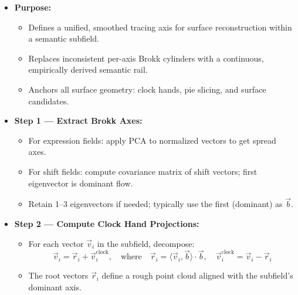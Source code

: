         \begin{itemize}
            \item \textbf{Purpose:}
                  \begin{itemize}
                      \item Defines a unified, smoothed tracing axis for surface reconstruction within a semantic subfield.
                      \item Replaces inconsistent per-axis Brokk cylinders with a continuous, empirically derived semantic rail.
                      \item Anchors all surface geometry: clock hands, pie slicing, and surface candidates.
                  \end{itemize}

            \item \textbf{Step 1 — Extract Brokk Axes:}
                  \begin{itemize}
                      \item For expression fields: apply PCA to normalized vectors to get spread axes.
                      \item For shift fields: compute covariance matrix of shift vectors; first eigenvector is dominant flow.
                      \item Retain 1–3 eigenvectors if needed; typically use the first (dominant) as $\vec{b}$.
                  \end{itemize}

            \item \textbf{Step 2 — Compute Clock Hand Projections:}
                  \begin{itemize}
                      \item For each vector $\vec{v}_i$ in the subfield, decompose:
                            \[
                                \vec{v}_i = \vec{r}_i + \vec{v}_i^{\text{clock}}, \quad \text{where} \quad
                                \vec{r}_i = \langle \vec{v}_i, \vec{b} \rangle \cdot \vec{b}, \quad
                                \vec{v}_i^{\text{clock}} = \vec{v}_i - \vec{r}_i
                            \]
                      \item The root vectors $\vec{r}_i$ define a rough point cloud aligned with the subfield's dominant axis.
                  \end{itemize}


\end{itemize}
